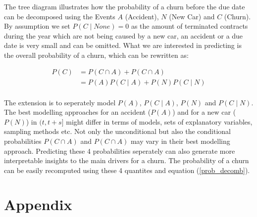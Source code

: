 \documentclass[12pt,titlepage]{article}
\begin{document}
\noindent
The tree diagram illustrates how the probability of a churn before the due date can be decomposed using the Events $A$ (Accident), $N$ (New Car) and $C$ (Churn). By assumption we set $P(C\mid None) = 0$ as the amount of terminated contracts during the year which are not being caused by a new car, an accident or a due date is very small and can be omitted. What we are interested in predicting is the overall probability of a churn, which can be rewritten as:
\noindent
\begin{center}
\begin{equation} \label{prob_decomb}
    \begin{aligned}
        P(C) & = P(C\cap A) + P(C\cap A) \\
        & = P(A)P(C\mid A) + P(N)P(C\mid N) \\
    \end{aligned}
\end{equation}
\end{center}
\vspace{1mm}

\noindent
The extension is to seperately model $P(A)$, $P(C\mid A)$, $P(N)$ and $P(C\mid N)$. The best modelling approaches for an accident ($P(A)$) and for a new car ($P(N)$) in $(t, t+s]$ might differ in terms of models, sets of explanatory variables, sampling methods etc. Not only the unconditional but also the conditional probabilities $P(C\cap A)$ and $P(C\cap A)$ may vary in their best modelling approach. Predicting these 4 probabilities seperately can also generate more interpretable insights to the main drivers for a churn. The probability of a churn can be easily recomputed using these 4 quantites and equation (\ref{prob_decomb}). \\

\newpage

\thispagestyle{empty}

\printbibliography

\vspace*{6mm}

\newpage

\thispagestyle{empty}

\section*{Appendix} \par
\end{document}
